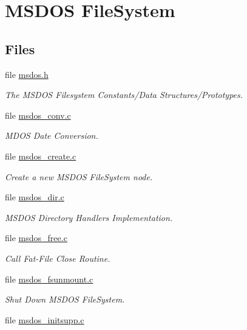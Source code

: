 \hypertarget{group__libfs__msdos}{}\section{M\+S\+D\+OS File\+System}
\label{group__libfs__msdos}
\subsection*{Files}
\begin{DoxyCompactItemize}
\item 
file \mbox{\hyperlink{msdos_8h}{msdos.\+h}}
\begin{DoxyCompactList}\small\item\em The M\+S\+D\+OS Filesystem Constants/\+Data Structures/\+Prototypes. \end{DoxyCompactList}\item 
file \mbox{\hyperlink{msdos__conv_8c}{msdos\+\_\+conv.\+c}}
\begin{DoxyCompactList}\small\item\em M\+D\+OS Date Conversion. \end{DoxyCompactList}\item 
file \mbox{\hyperlink{msdos__create_8c}{msdos\+\_\+create.\+c}}
\begin{DoxyCompactList}\small\item\em Create a new M\+S\+D\+OS File\+System node. \end{DoxyCompactList}\item 
file \mbox{\hyperlink{msdos__dir_8c}{msdos\+\_\+dir.\+c}}
\begin{DoxyCompactList}\small\item\em M\+S\+D\+OS Directory Handlers Implementation. \end{DoxyCompactList}\item 
file \mbox{\hyperlink{msdos__free_8c}{msdos\+\_\+free.\+c}}
\begin{DoxyCompactList}\small\item\em Call Fat-\/\+File Close Routine. \end{DoxyCompactList}\item 
file \mbox{\hyperlink{msdos__fsunmount_8c}{msdos\+\_\+fsunmount.\+c}}
\begin{DoxyCompactList}\small\item\em Shut Down M\+S\+D\+OS File\+System. \end{DoxyCompactList}\item 
file \mbox{\hyperlink{msdos__initsupp_8c}{msdos\+\_\+initsupp.\+c}}

\end{DoxyCompactItemize}
